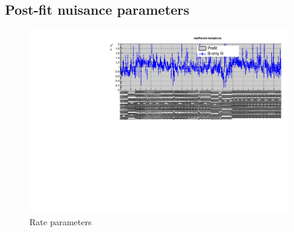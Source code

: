 %
%

\clearpage
\subsection{Post-fit nuisance parameters}
\label{app:nuispost}

\begin{figure}[h!]
  \centering
  \caption{Rate parameters}
  \includegraphics[width=1.\linewidth]{figures/results/36invfb_approval/postfit/nuis/Rates_nuisances}
\end{figure}

